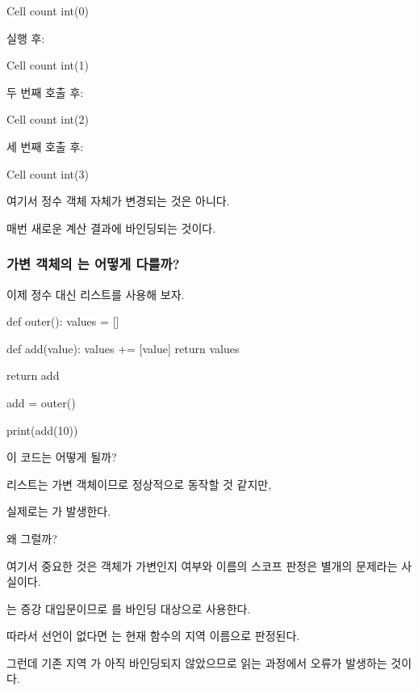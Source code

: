 \begin{dhksmry}
    Cell count \ra int(0)
\end{dhksmry}

 실행 후:

\begin{dhksmry}
    Cell count \ra int(1)
\end{dhksmry}

두 번째 호출 후:

\begin{dhksmry}
    Cell count \ra int(2)
\end{dhksmry}

세 번째 호출 후:

\begin{dhksmry}
    Cell count \ra int(3)
\end{dhksmry}

여기서 정수 객체 자체가 변경되는 것은 아니다.

매번 새로운 계산 결과에 바인딩되는 것이다.

\subsubsection{가변 객체의 \zsh{+=}는 어떻게 다를까?}

이제 정수 대신 리스트를 사용해 보자.

\begin{dhkcode}
def outer():
    values = []

    def add(value):
        values += [value]
        return values

    return add


add = outer()

print(add(10))
\end{dhkcode}

이 코드는 어떻게 될까?

리스트는 가변 객체이므로 정상적으로 동작할 것 같지만,

실제로는 가 발생한다.

왜 그럴까?

여기서 중요한 것은 객체가 가변인지 여부와 이름의 스코프 판정은 별개의 문제라는 사실이다.

는 증강 대입문이므로 를 바인딩 대상으로 사용한다.

따라서  선언이 없다면 는 현재 함수의 지역 이름으로 판정된다.

그런데 기존 지역 가 아직 바인딩되지 않았으므로 읽는 과정에서 오류가 발생하는 것이다.

